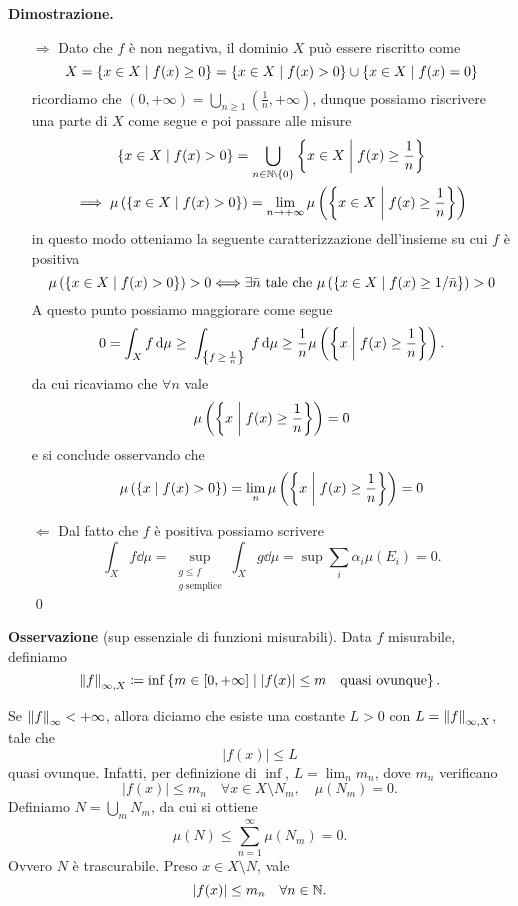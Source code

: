 \textbf{Dimostrazione.}
\begin{itemize}

\item[$\boxed{\Rightarrow}$] Dato che $f$ è non negativa, il dominio $X$ può essere riscritto come
$$
	X = \left\{ x \in X \;\middle|\; f(x) \geq 0 \right\} = \left\{ x \in X \;\middle|\; f(x) > 0 \right\} \cup \left\{ x \in X \;\middle|\; f(x) = 0 \right\}
$$
ricordiamo che $(0, +\infty) = \bigcup_{n \geq 1} (\frac{1}{n}, +\infty)$, dunque possiamo riscrivere una parte di $X$ come segue e poi passare alle misure
$$
\begin{gathered}
	\left\{ x \in X \mymid f(x) > 0 \right\} =  \bigcup_{n \in \N \setminus \left\{ 0 \right\}} \left\{ x \in X \mymid f(x) \geq \frac{1}{n} \right\} \\
	\implies \mu \left( \left\{ x \in X \mymid f(x) > 0 \right\} \right) 
	= \lim_{n \to +\infty} \mu\left(\left\{ x \in X \mymid f(x) \geq \frac{1}{n} \right\}\right)
\end{gathered}
$$
in questo modo otteniamo la seguente caratterizzazione dell'insieme su cui $f$ è positiva
$$
\mu \left( \left\{ x \in X \;\middle|\; f(x) > 0 \right\} \right) >0 
\Longleftrightarrow
\exists \bar{n} \text{ tale che } \mu \left( \left\{ x \in X \;\middle|\; f(x) \geq 1 / \bar{n} \right\} \right) > 0
$$
A questo punto possiamo maggiorare come segue
$$
0 = \int_X f \,\mathrm{d} \mu 
\geq \;\int_{\left\{ f \,\geq\, \frac{1}{n} \right\}} \; f \,\mathrm{d} \mu \geq	\frac{1}{n} \mu \left(  \left\{ x \;\middle|\; f(x) \geq \frac{1}{n} \right\} \right). 
$$
da cui ricaviamo che $\forall n$ vale
$$
\mu \left(  \left\{ x \;\middle|\; f(x) \geq \frac{1}{n} \right\} \right) = 0
$$
e si conclude osservando che
$$
\mu \left(  \left\{ x \;\middle|\; f(x) > 0 \right\} \right) = \lim_n \mu \left( \left\{ x \;\middle|\; f(x) \geq \frac{1}{n} \right\} \right) = 0
$$

\item[$\boxed{\Leftarrow}$]
Dal fatto che $f$ è positiva possiamo scrivere
$$
	\int_X f \dd \mu = \sup_{\substack{g \leq f \\ g \; \text{semplice}}} \int_X g \dd \mu = \sup \sum_{i}^{} \alpha_i \mu(E_i) = 0. 
$$
\qed

\end{itemize}

\textbf{Osservazione} (sup essenziale di funzioni misurabili).
Data $f$ misurabile, definiamo
$$
	\left\lVert  f  \right\rVert_{\infty, X} \coloneqq \inf \left\{ m \in [0,+\infty] \;\middle|\; \left| f(x) \right| \leq m \quad \text{quasi ovunque}  \right\}.
$$

Se $\left\lVert  f  \right\rVert_{\infty} < + \infty$, allora diciamo che esiste una costante $L > 0$ con $L = \left\lVert  f  \right\rVert_{\infty, X}$, tale che 
$$
	\left| f(x) \right| \leq L
$$
quasi ovunque. 
Infatti, per definizione di $\inf$, $L = \lim_n m_n$, dove $m_n$ verificano
$$
	\left| f(x) \right| \leq m_n \quad \forall x \in X \setminus N_m, \quad \mu(N_m) = 0.
$$
Definiamo $N = \bigcup_{m} N_m$, da cui si ottiene
$$
	\mu(N) \leq \sum_{n=1}^{\infty} \mu (N_m) = 0. 
$$
Ovvero $N$ è trascurabile.
Preso $x \in X \setminus N$, vale
$$
	\left| f(x) \right| \leq m_n \quad \forall n \in \mathbb N.
$$


